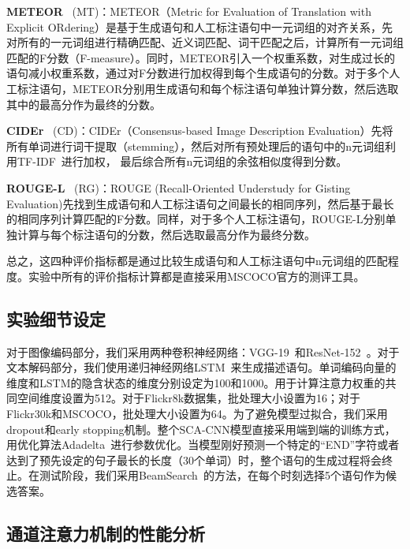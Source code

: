 \textbf{METEOR}~\cite{banerjee2005meteor} (MT)：METEOR（Metric for Evaluation of Translation with Explicit ORdering）是基于生成语句和人工标注语句中一元词组的对齐关系，先对所有的一元词组进行精确匹配、近义词匹配、词干匹配之后，计算所有一元词组匹配的F分数（F-measure）。同时，METEOR引入一个权重系数，对生成过长的语句减小权重系数，通过对F分数进行加权得到每个生成语句的分数。对于多个人工标注语句，METEOR分别用生成语句和每个标注语句单独计算分数，然后选取其中的最高分作为最终的分数。

\textbf{CIDEr}~\cite{vedantam2015cider} (CD)：CIDEr（Consensus-based Image Description Evaluation）先将所有单词进行词干提取（stemming），然后对所有预处理后的语句中的n元词组利用TF-IDF~\cite{robertson2004understanding}进行加权，
最后综合所有n元词组的余弦相似度得到分数。

\textbf{ROUGE-L}~\cite{lin2002manual} (RG)：ROUGE (Recall-Oriented Understudy for Gisting Evaluation)先找到生成语句和人工标注语句之间最长的相同序列，然后基于最长的相同序列计算匹配的F分数。同样，对于多个人工标注语句，ROUGE-L分别单独计算与每个标注语句的分数，然后选取最高分作为最终分数。

总之，这四种评价指标都是通过比较生成语句和人工标注语句中n元词组的匹配程度。实验中所有的评价指标计算都是直接采用MSCOCO官方的测评工具。


\subsection{实验细节设定}
对于图像编码部分，我们采用两种卷积神经网络：VGG-19~\cite{simonyan2015very}和ResNet-152~\cite{he2016deep}。对于文本解码部分，我们使用递归神经网络LSTM~\cite{hochreiter1997long}来生成描述语句。单词编码向量的维度和LSTM的隐含状态的维度分别设定为100和1000。用于计算注意力权重的共同空间维度设置为512。对于Flickr8k数据集，批处理大小设置为16；对于Flickr30k和MSCOCO，批处理大小设置为64。为了避免模型过拟合，我们采用dropout和early stopping机制。整个SCA-CNN模型直接采用端到端的训练方式，用优化算法Adadelta~\cite{zeiler2012adadelta}进行参数优化。当模型刚好预测一个特定的“END”字符或者达到了预先设定的句子最长的长度（30个单词）时，整个语句的生成过程将会终止。在测试阶段，我们采用BeamSearch~\cite{vinyals2015show}的方法，在每个时刻选择5个语句作为候选答案。


\subsection{通道注意力机制的性能分析}

